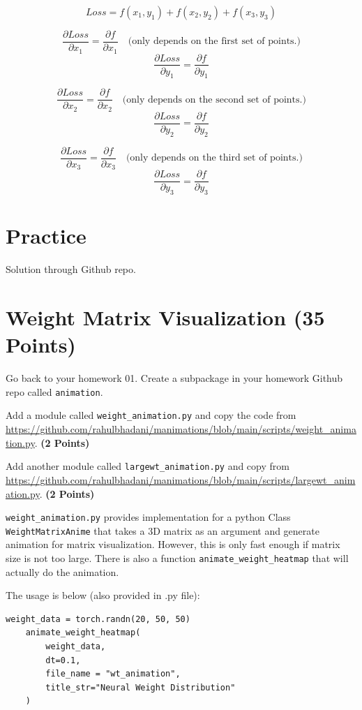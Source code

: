 \documentclass[12pt, xcolor=dvipsnames,svgnames,x11names]{article}
\begin{document}
$$Loss = f(x_1, y_1) + f(x_2, y_2) + f(x_3, y_3)$$

$$\frac{\partial Loss}{\partial x_1} = \frac{\partial f}{\partial x_1} \quad \text{(only depends on the first set of points.)}$$
$$\frac{\partial Loss}{\partial y_1} = \frac{\partial f}{\partial y_1}$$

$$\frac{\partial Loss}{\partial x_2} = \frac{\partial f}{\partial x_2} \quad \text{(only depends on the second set of points.)}$$
$$\frac{\partial Loss}{\partial y_2} = \frac{\partial f}{\partial y_2}$$

$$\frac{\partial Loss}{\partial x_3} = \frac{\partial f}{\partial x_3} \quad \text{(only depends on the third set of points.)}$$
$$\frac{\partial Loss}{\partial y_3} = \frac{\partial f}{\partial y_3}$$

\section*{Practice}

Solution through Github repo.

\section{Weight Matrix Visualization (35 Points)}
Go back to your homework 01. Create a subpackage in your homework Github repo called \texttt{animation}.

Add a module called \texttt{weight\_animation.py} and copy the code from \url{https://github.com/rahulbhadani/manimations/blob/main/scripts/weight_animation.py}. \hfill \textbf{(2 Points)}

Add another module called \texttt{largewt\_animation.py} and copy from \url{https://github.com/rahulbhadani/manimations/blob/main/scripts/largewt_animation.py}. \hfill \textbf{(2 Points)}


\texttt{weight\_animation.py} provides implementation for a python Class \texttt{WeightMatrixAnime} that takes a 3D matrix as an argument and generate animation for matrix visualization. However, this is only fast enough if matrix size is not too large. There is also a function \texttt{animate_weight_heatmap} that will actually do the animation.

The usage is below (also provided in .py file):

\begin{verbatim}
weight_data = torch.randn(20, 50, 50)
    animate_weight_heatmap(
        weight_data, 
        dt=0.1,
        file_name = "wt_animation",
        title_str="Neural Weight Distribution"
    )

\end{verbatim}
\end{document}
